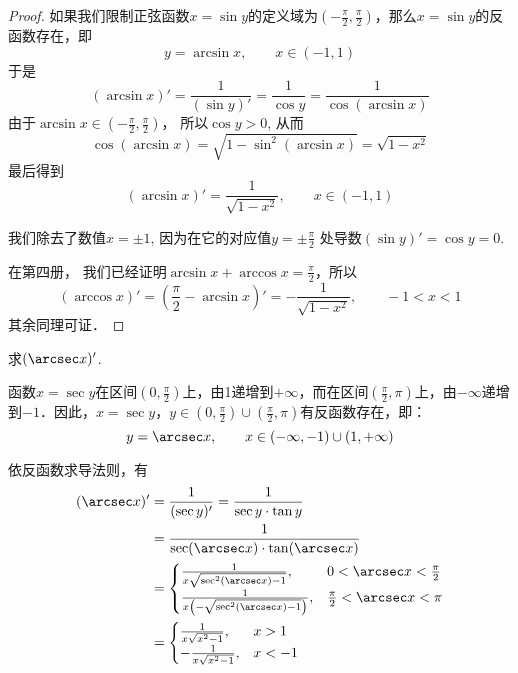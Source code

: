 \begin{proof}
如果我们限制正弦函数$x=\sin y$的定义域为$\left(-\frac{\pi}{2},\frac{\pi}{2}\right)$，那么$x=\sin y$的反函数存在，即
\[    y=\arcsin x,\qquad x\in (-1, 1)\]
于是
\[    (\arcsin x)'=\frac{1}{(\sin y)'}=\frac{1}{\cos y}=\frac{1}{\cos(\arcsin x)}\]
由于$\arcsin x\in \left(-\frac{\pi}{2},\frac{\pi}{2}\right)$，
所以$\cos y>0$, 从而
\[    \cos (\arcsin x) =\sqrt{1-\sin^2 (\arcsin x)} =\sqrt{1-x^2}\]
    最后得到
\[  (\arcsin x)'=\frac{1}{\sqrt{1-x^2}},\qquad x\in (-1, 1) \]

我们除去了数值$x=\pm 1$, 因为在它的对应值$y=\pm\frac{\pi}{2}$
处导数$(\sin y)'=\cos y=0$.

在第四册， 我们已经证明$\arcsin x+\arccos x=\frac{\pi}{2}$，所以
\[(\arccos x)'=\left(\frac{\pi}{2}-\arcsin x\right)'=-\frac{1}{\sqrt{1-x^2}},\qquad -1<x<1\]
其余同理可证．
\end{proof}

\begin{example}
求$(\arcsec x)'$.
\end{example}


\begin{solution}
函数$x=\sec y$在区间$\left(0,\frac{\pi}{2}\right)$上，由1递增到$+\infty$，而在区间$\left(\frac{\pi}{2},\pi\right)$上，由$-\infty$递增到$-1$．因此，$x=\sec y$，$y\in\left(0,\frac{\pi}{2}\right)\cup \left(\frac{\pi}{2},\pi\right)$有反函数存在，即：
\[y=\arcsec x,\qquad x\in (-\infty,-1)\cup(1,+\infty)\]

依反函数求导法则，有
\begin{align*}
    (\arcsec x)'&=\frac{1}{(\sec y)'}=\frac{1}{\sec y\cdot \tan y}\\
    &=\frac{1}{\sec(\arcsec x)\cdot \tan(\arcsec x)}\\
    &=\begin{cases}
        \frac{1}{x\sqrt{\sec^2(\arcsec x)-1}}, & 0<\arcsec x<\frac{\pi}{2}\\
        \frac{1}{x\left(-\sqrt{\sec^2(\arcsec x)-1}\right)}, & \frac{\pi}{2}<\arcsec x<\pi \\
    \end{cases}\\
    &=\begin{cases}
        \frac{1}{x\sqrt{x^2-1}}, & x>1\\
       - \frac{1}{x\sqrt{x^2-1}}, & x<-1
    \end{cases}
\end{align*}
\end{solution}

